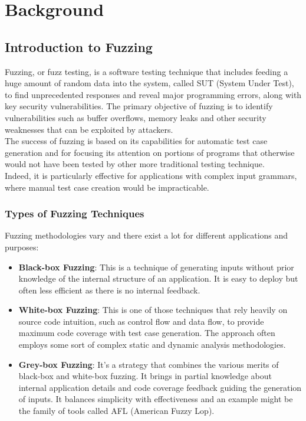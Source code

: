 \chapter{Background}

\section{Introduction to Fuzzing}

Fuzzing, or fuzz testing, is a software testing technique that includes feeding a huge amount of random data into the system, called SUT (System Under Test), to find unprecedented responses and reveal major programming errors, along with key security vulnerabilities. The primary objective of fuzzing is to identify vulnerabilities such as buffer overflows, memory leaks and other security weaknesses that can be exploited by attackers.
\\The success of fuzzing is based on its capabilities for automatic test case generation and for focusing its attention on portions of programs that otherwise would not have been tested by other more traditional testing technique.
\\Indeed, it is particularly effective for applications with complex input grammars, where manual test case creation would be impracticable.

\subsection{Types of Fuzzing Techniques}
Fuzzing methodologies vary and there exist a lot for different applications and purposes:

\begin{itemize}
    \item \textbf{Black-box Fuzzing}: This is a technique of generating inputs without prior knowledge of the internal structure of an application. It is easy to deploy but often less efficient as there is no internal feedback.
    
    \item \textbf{White-box Fuzzing}: This is one of those techniques that rely heavily on source code intuition, such as control flow and data flow, to provide maximum code coverage with test case generation. The approach often employs some sort of complex static and dynamic analysis methodologies.
    
    \item \textbf{Grey-box Fuzzing}: It's a strategy that combines the various merits of black-box and white-box fuzzing. It brings in partial knowledge about internal application details and code coverage feedback guiding the generation of inputs. It balances simplicity with effectiveness and an example might be the family of tools called AFL (American Fuzzy Lop).
\end{itemize}

